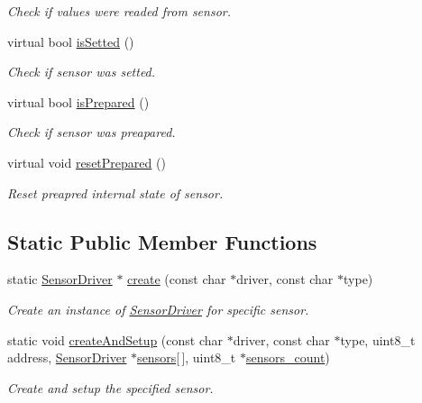 \begin{DoxyCompactItemize}
\begin{DoxyCompactList}\small\item\em Check if values were readed from sensor. \end{DoxyCompactList}\item 
virtual bool \hyperlink{classSensorDriver_a0f64839cf7719b5782c93e54485d3b11}{is\+Setted} ()
\begin{DoxyCompactList}\small\item\em Check if sensor was setted. \end{DoxyCompactList}\item 
virtual bool \hyperlink{classSensorDriver_a17672e5f12749c3dca5d6c2c4b73b7c3}{is\+Prepared} ()
\begin{DoxyCompactList}\small\item\em Check if sensor was preapared. \end{DoxyCompactList}\item 
virtual void \hyperlink{classSensorDriver_a2b347ee438af49b939cb1e79c068681f}{reset\+Prepared} ()
\begin{DoxyCompactList}\small\item\em Reset preapred internal state of sensor. \end{DoxyCompactList}\end{DoxyCompactItemize}
\subsection*{Static Public Member Functions}
\begin{DoxyCompactItemize}
\item 
static \hyperlink{classSensorDriver}{Sensor\+Driver} $\ast$ \hyperlink{classSensorDriver_a42e3b501ef28a0a8ba7e045f84e3d76a}{create} (const char $\ast$driver, const char $\ast$type)
\begin{DoxyCompactList}\small\item\em Create an instance of \hyperlink{classSensorDriver}{Sensor\+Driver} for specific sensor. \end{DoxyCompactList}\item 
static void \hyperlink{classSensorDriver_a2755446e2c1306db071c4c5eb62ab830}{create\+And\+Setup} (const char $\ast$driver, const char $\ast$type, uint8\+\_\+t address, \hyperlink{classSensorDriver}{Sensor\+Driver} $\ast$\hyperlink{i2c-th_8h_ac07b59f913caef2eaea4e4bb93c901e9}{sensors}\mbox{[}$\,$\mbox{]}, uint8\+\_\+t $\ast$\hyperlink{i2c-th_8h_a7727577f63dfa4aa55feb7ddd0739f83}{sensors\+\_\+count})
\begin{DoxyCompactList}\small\item\em Create and setup the specified sensor. \end{DoxyCompactList}\end{DoxyCompactItemize}
